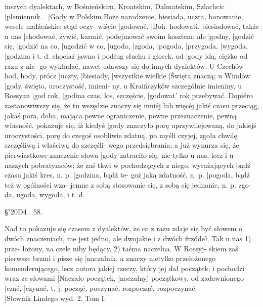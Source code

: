 inszych dyalektach, w Bośnieńskirn, Kroatskim, Dalmatskim,
Szlachcic |{plemiennik}. \textemdash \ |{Gody} w Polskim Boże narodzenie,
biesiada, uczta, bonowanie, wesele małżeńskie; stąd oczy-
wiście |{godować}. |{Boh}. hodowati, biesiadować, także u nas
|{chodować}, żywić, karmić, podejmować swoim kosztem; ale
|{godny}, |{godzić się}, |{godzić} na co, |{ugodzić} w co, |{ugoda}, |{zgoda},
|{pogoda}, |{przygoda}, |{wygoda}, |{godzina} i t. d. chociaż jawno i
podług słuchu i głosek, od |{gody} idą, ciężko od razu z nie-
go wykładać, nawet udawszy się do innych dyalektów. U
Czechów hod, hody, prócz |{uczty}, |{biesiady}, |{wszystkie wielkie}
|{Święta} znaczą; u Windów |{gody}, święto, uroczystość, imieni-
ny, u Kraińczyków szczególnie imieniny, u Rossyan |{god}
rok, |{godina} czas, los, szczęście, |{godowat'} rok przebywać.
Dopiéro zastanowiwszy się, że tu wszędzie znaczy się mniéj
lub więcéj jakiś czasu przeciąg, jakaś pora, doba, mająca
pewne ograniczenie, pewne przeznaczenie, pewną własność,
pokazuje się, iż kiedyś |{gody} znaczyło porę uprzywilejowaną,
do jakiejś uroczystości, porę do czegoś osobliwie zdatną, po
myśli czyjej, zgoła chwilę szczęśliwą i właściwą do szczęśli-
wego przedsiębrania; a już wynurza się, że pierwiastkowe
znaczenie słowa |{gody} zatraciło się, nie tylko u nas, lecz i u
naszych pobratymców; że zaś tkwi w pochodzących z niego,
wyrażających bądź czasu jakiś kres, n. p. |{godzina}, bądź te-
goż jaką zdatność, n. p. |{pogoda}, bądź też w ogólności wza-
jemne z sobą stosowanie się, z sobą się jednanie, n. p. zgo-
da, ugoda, wygoda, i t. d. \\
\begin{center}
§\char"20D4 . 58. \\
\end{center}
\hspace {1 cm} Nad to pokazuje się czasem z dyalektów, że co z razu
zdaje się być słowem o dwóch znaczeniach, nie jest jedno,
ale dwojakie i z dwóch źrzódeł. Tak  u nas 1) prze-
łożony, na czele niby będący, 2) taśma naczelna. W Rossyj-
skiem zaś pierwsze brzmi i pisze się |{naczalnik}, a znaczy
nietylko przełożonego komenderującego, lecz autora jakiej
rzeczy, który jej dał początek; i pochodzi wraz ze słowami
|{Naczało} początek, %
|{naczalnyj} początkowy, od zadawnionego
|{cząć}, |{czynać}, t. j. począć, poczynać, rozpocząć, rozpoczynać. \\
{\hspace {0,3 cm} \tiny |{Słownik Lindego wyd. 2.} Tom I.}
\endinput


